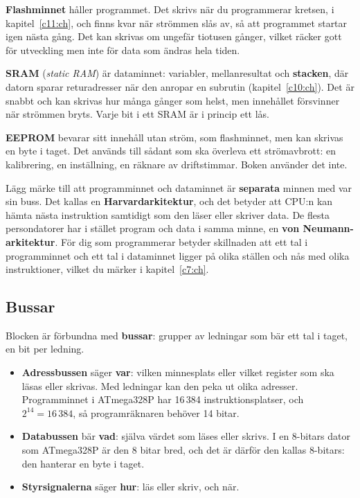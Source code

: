 \textbf{Flashminnet} håller programmet. Det skrivs när du programmerar kretsen, i
kapitel~\ref{c11:ch}, och finns kvar när strömmen slås av, så att programmet startar igen nästa
gång. Det kan skrivas om ungefär tiotusen gånger, vilket räcker gott för utveckling men inte för
data som ändras hela tiden.

\textbf{SRAM} (\emph{static RAM}) är dataminnet: variabler, mellanresultat och \textbf{stacken},
där datorn sparar returadresser när den anropar en subrutin (kapitel~\ref{c10:ch}). Det är snabbt
och kan skrivas hur många gånger som helst, men innehållet försvinner när strömmen bryts. Varje bit
i ett SRAM är i princip ett lås.

\textbf{EEPROM} bevarar sitt innehåll utan ström, som flashminnet, men kan skrivas en byte i taget.
Det används till sådant som ska överleva ett strömavbrott: en kalibrering, en inställning, en
räknare av driftstimmar. Boken använder det inte.

Lägg märke till att programminnet och dataminnet är \textbf{separata} minnen med var sin buss. Det
kallas en \textbf{Harvardarkitektur}, och det betyder att CPU:n kan hämta nästa instruktion
samtidigt som den läser eller skriver data. De flesta persondatorer har i stället program och data i
samma minne, en \textbf{von Neumann-arkitektur}. För dig som programmerar betyder skillnaden att ett
tal i programminnet och ett tal i dataminnet ligger på olika ställen och nås med olika
instruktioner, vilket du märker i kapitel~\ref{c7:ch}.

\subsection{Bussar}
\label{c6:b6}
Blocken är förbundna med \textbf{bussar}: grupper av ledningar som bär ett tal i taget, en bit per
ledning.
\begin{itemize}
  \item \textbf{Adressbussen} säger \textbf{var}: vilken minnesplats eller vilket register som ska
    läsas eller skrivas. Med  ledningar kan den peka ut  olika adresser.
    Programminnet i ATmega328P har 16\,384 instruktionsplatser, och $2^{14} = 16\,384$, så
    programräknaren behöver 14 bitar.
  \item \textbf{Databussen} bär \textbf{vad}: själva värdet som läses eller skrivs. I en 8-bitars
    dator som ATmega328P är den 8 bitar bred, och det är därför den kallas 8-bitars: den hanterar
    en byte i taget.
  \item \textbf{Styrsignalerna} säger \textbf{hur}: läs eller skriv, och när.
\end{itemize}

